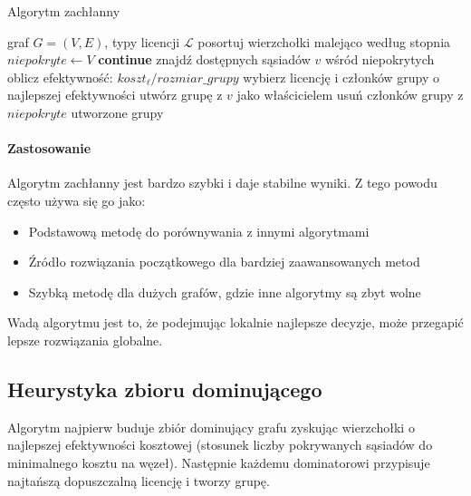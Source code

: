 \begin{algorithm}[H]
  \caption{Algorytm zachłanny}
  \label{alg:greedy}
  \begin{algorithmic}[1]
    \Require graf $G=(V,E)$, typy licencji $\mathcal{L}$
    \State posortuj wierzchołki malejąco według stopnia
    \State $niepokryte \gets V$
     \textbf{continue} \EndIf
    \State znajdź dostępnych sąsiadów $v$ wśród niepokrytych
    \State oblicz efektywność: $koszt_\ell / rozmiar\_grupy$
    \EndFor
    \State wybierz licencję i członków grupy o najlepszej efektywności
    \State utwórz grupę z $v$ jako właścicielem
    \State usuń członków grupy z $niepokryte$
    \EndFor
    \State \Return utworzone grupy
  \end{algorithmic}
\end{algorithm}

\paragraph{Zastosowanie}
Algorytm zachłanny jest bardzo szybki i daje stabilne wyniki. Z tego powodu często używa się go jako:
\begin{itemize}
  \item Podstawową metodę do porównywania z innymi algorytmami
  \item Źródło rozwiązania początkowego dla bardziej zaawansowanych metod
  \item Szybką metodę dla dużych grafów, gdzie inne algorytmy są zbyt wolne
\end{itemize}
Wadą algorytmu jest to, że podejmując lokalnie najlepsze decyzje, może przegapić lepsze rozwiązania globalne.

\subsection{Heurystyka zbioru dominującego}\label{subsec:ds}

Algorytm najpierw buduje zbiór dominujący grafu zyskując wierzchołki o najlepszej efektywności kosztowej (stosunek liczby pokrywanych sąsiadów do minimalnego kosztu na węzeł). Następnie każdemu dominatorowi przypisuje najtańszą dopuszczalną licencję i tworzy grupę.

